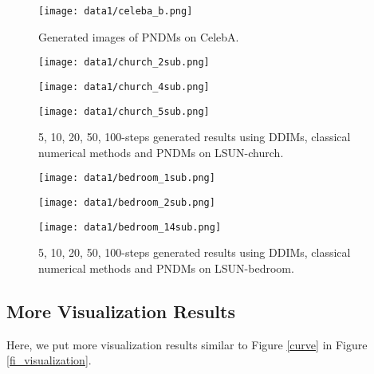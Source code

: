 \documentclass{article}
\begin{document}
\begin{figure}[htbp]
   \centering
   \texttt{[image: data1/celeba\_b.png]}
   \caption{Generated images of PNDMs on CelebA.}
   \label{fi_celeba_f}
\end{figure}


\begin{figure}[!htbp]
   \centering
   \begin{minipage}[t]{0.9\linewidth}
      \centering
      \texttt{[image: data1/church\_2sub.png]}  
   \end{minipage}
   \begin{minipage}[t]{0.9\linewidth}
      \centering
      \texttt{[image: data1/church\_4sub.png]}
   \end{minipage}
   \begin{minipage}[t]{0.9\linewidth}
      \centering
      \texttt{[image: data1/church\_5sub.png]}
   \end{minipage}
   \caption{5, 10, 20, 50, 100-steps generated results using DDIMs, classical numerical methods and PNDMs on LSUN-church.}
   \label{fi_church_conti}
\end{figure}

\begin{figure}[!htbp]
   \centering
   \begin{minipage}[t]{0.9\linewidth}
      \centering
      \texttt{[image: data1/bedroom\_1sub.png]}  
   \end{minipage}
   \begin{minipage}[t]{0.9\linewidth}
      \centering
      \texttt{[image: data1/bedroom\_2sub.png]}
   \end{minipage}
   \begin{minipage}[t]{0.9\linewidth}
      \centering
      \texttt{[image: data1/bedroom\_14sub.png]}
   \end{minipage}
   \caption{5, 10, 20, 50, 100-steps generated results using DDIMs, classical numerical methods and PNDMs on  LSUN-bedroom.}
   \label{fi_bedroom_conti}
\end{figure}

\clearpage

\subsection{More Visualization Results}
\label{visual_results}

Here, we put more visualization results similar to Figure \ref{curve} in Figure \ref{fi_visualization}.
\end{document}
